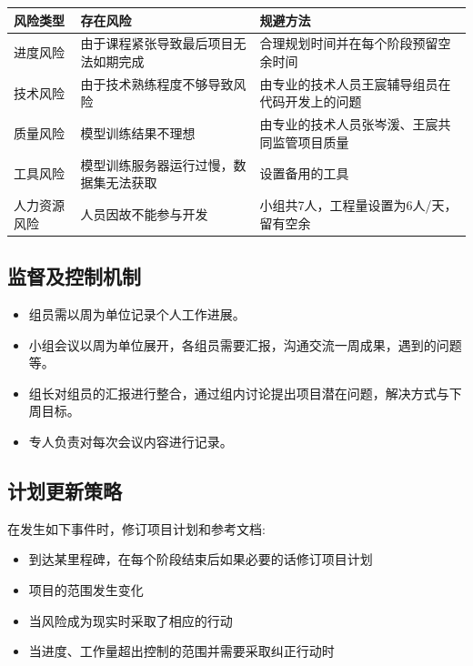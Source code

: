 \documentclass[
  hyperref, a4paper]{ctexart}
\providecommand{\tightlist}{%
  \setlength{\itemsep}{0pt}\setlength{\parskip}{0pt}}
\begin{document}
\begin{table}[H]
\small 
\begin{center}  
\begin{tabular}{|p{1.5cm}|p{3cm}|p{5cm}|}  
\hline  
风险类型 & 存在风险 & 规避方法  \\ \hline  
进度风险 & 由于课程紧张导致最后项目无法如期完成 & 合理规划时间并在每个阶段预留空余时间 \\ \hline  
技术风险 & 由于技术熟练程度不够导致风险 & 由专业的技术人员王宸辅导组员在代码开发上的问题 \\  \hline  
质量风险 & 模型训练结果不理想 & 由专业的技术人员张岑湲、王宸共同监管项目质量 \\  \hline  
工具风险 & 模型训练服务器运行过慢，数据集无法获取 & 设置备用的工具 \\  \hline  
人力资源风险 & 人员因故不能参与开发 & 小组共7人，工程量设置为6人/天，留有空余 \\  \hline  
\end{tabular}  
\end{center}  
\end{table}

\hypertarget{ux76d1ux7763ux53caux63a7ux5236ux673aux5236}{%
\subsection{监督及控制机制}\label{ux76d1ux7763ux53caux63a7ux5236ux673aux5236}}

\begin{itemize}
\tightlist
\item
  组员需以周为单位记录个人工作进展。
\item
  小组会议以周为单位展开，各组员需要汇报，沟通交流一周成果，遇到的问题等。
\item
  组长对组员的汇报进行整合，通过组内讨论提出项目潜在问题，解决方式与下周目标。
\item
  专人负责对每次会议内容进行记录。
\end{itemize}

\hypertarget{ux8ba1ux5212ux66f4ux65b0ux7b56ux7565}{%
\subsection{计划更新策略}\label{ux8ba1ux5212ux66f4ux65b0ux7b56ux7565}}

在发生如下事件时，修订项目计划和参考文档:

\begin{itemize}
\tightlist
\item
  到达某里程碑，在每个阶段结束后如果必要的话修订项目计划
\item
  项目的范围发生变化
\item
  当风险成为现实时采取了相应的行动
\item
  当进度、工作量超出控制的范围并需要采取纠正行动时
\end{itemize}
\end{document}
